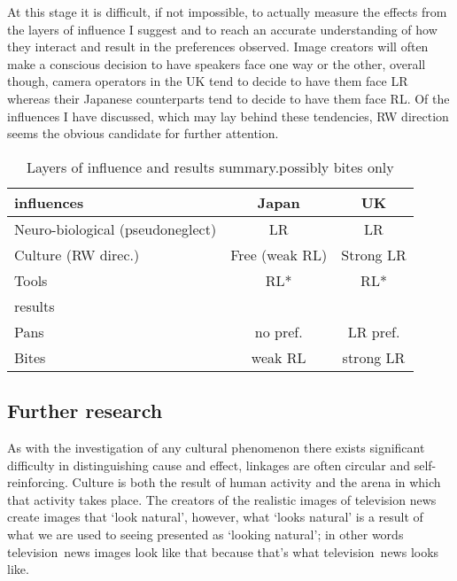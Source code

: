\documentclass[11pt, oneside, a4paper]{scrartcl}
\newcommand{\tv}{television}
\begin{document}
At this stage it is difficult, if not impossible, to actually measure the  effects from the layers of influence I suggest and to reach an accurate understanding of how they interact and result in the preferences observed. Image creators will often make a conscious decision to have speakers face one way or the other, overall though, camera operators in the UK tend to decide to have them face LR whereas their Japanese counterparts tend to decide to have them face RL. Of the influences I have discussed, which may lay behind these tendencies, RW direction seems the obvious candidate for further attention.

\begin{table}[tb]
\begin{center}
\begin{tabular}{lcc}
\toprule
\sc influences& Japan & UK \\ 
\midrule
Neuro-biological (pseudoneglect){ }& LR & LR\\ 
Culture (RW direc.) & { }Free (weak RL) & { }Strong LR  \\ 
Tools & RL* & RL*\\ 
\midrule
\sc results & & \\
\midrule
Pans & no pref. & LR pref.\\
Bites & weak RL & strong LR\\
\bottomrule
\end{tabular}
\end{center}
\caption[Layers of influence and results summary.]{Layers of influence and results summary.\newline \footnotesize *possibly bites only\label{inf-summ}}
\end{table}

\subsection{Further research}

As with the investigation of any cultural phenomenon there exists significant difficulty in distinguishing cause and effect, linkages are often circular and self-reinforcing. Culture is both the result of human activity and the arena in which that activity takes place. The creators of the realistic images of television news create images that `look natural', however, what `looks natural' is a result of what we are used to seeing presented as `looking natural'; in other words \tv\ news images look like that because that's what \tv\ news looks like.
\end{document}
